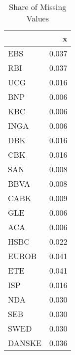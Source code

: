 \begin{table}

\caption{Share of Missing Values}
\centering
\begin{tabular}[t]{lr}
\toprule
  & x\\
\midrule
EBS & 0.037\\
RBI & 0.037\\
UCG & 0.016\\
BNP & 0.006\\
KBC & 0.006\\
\addlinespace
INGA & 0.006\\
DBK & 0.016\\
CBK & 0.016\\
SAN & 0.008\\
BBVA & 0.008\\
\addlinespace
CABK & 0.009\\
GLE & 0.006\\
ACA & 0.006\\
HSBC & 0.022\\
EUROB & 0.041\\
\addlinespace
ETE & 0.041\\
ISP & 0.016\\
NDA & 0.030\\
SEB & 0.030\\
SWED & 0.030\\
\addlinespace
DANSKE & 0.036\\
\bottomrule
\end{tabular}
\end{table}
